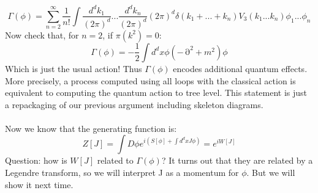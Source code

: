 \documentclass[12 pt]{article}
\DeclareMathOperator {\p} {\partial}
\begin{document}
\[   \Gamma(\phi) = \sum_{n=2}^{\infty} \frac{1}{n!} \int \frac{d^d k_1}{(2\pi)^d} ... \frac{d^d k_n}{(2\pi)^d} (2\pi)^d \delta(k_1+...+k_n) V_3(k_1...k_n) \phi_1 ... \phi_n   \]
Now check that, for $n=2$, if $\pi(k^2) = 0$:
\[    \Gamma(\phi) = - \frac{1}{2} \int d^d x \phi (-\p^2 + m^2) \phi   \]
Which is just the usual action! Thus $\Gamma(\phi)$ encodes additional quantum effects. More precisely, a process computed using all loops with the classical action is equivalent to computing the quantum action to tree level. This statement is just a repackaging of our previous argument including skeleton diagrams.
\\
\\
Now we know that the generating function is:
\[   Z[J] = \int D\phi  e^{i(S[\phi] + \int d^d x J \phi)}  = e^{iW[J]}  \]
Question: how is $W[J]$ related to $\Gamma(\phi)$? It turns out that they are related by a Legendre transform, so we will interpret J as a momentum for $\phi$. But we will show it next time.
\end{document}
